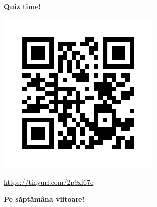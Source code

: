 \documentclass[xcolor=pdftex,romanian,colorlinks]{beamer}
\begin{document}
\begin{frame}
  \vfill
  \centering

\textbf{\large \alert{Quiz time!}}

\includegraphics[scale=.35]{../Quiz/C05-Q1.png}

 \url{https://tinyurl.com/2p9xf67e}
  \vfill
\end{frame}

\begin{frame}
  \vfill
  \centering

\textbf{Pe săptămâna viitoare!}

  \vfill
\end{frame}
\end{document}
